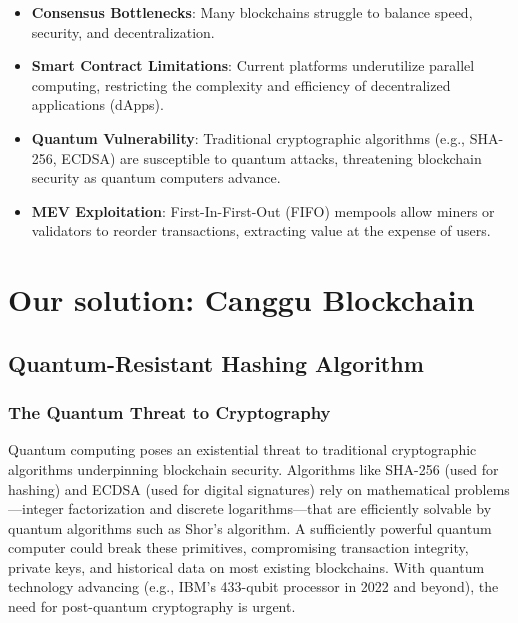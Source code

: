 \documentclass[12pt]{article}
\begin{document}
\begin{justify}
\begin{itemize}

    \item \textbf{Consensus Bottlenecks}: Many blockchains struggle to balance speed, security, and decentralization.
\item \textbf{Smart Contract Limitations}: Current platforms underutilize parallel computing, restricting the complexity and efficiency of decentralized applications (dApps).

    \item     \textbf{Quantum Vulnerability}: Traditional cryptographic algorithms (e.g., SHA-256, ECDSA) are susceptible to quantum attacks, threatening blockchain security as quantum computers advance.

    \item \textbf{MEV Exploitation}: First-In-First-Out (FIFO) mempools allow miners or validators to reorder transactions, extracting value at the expense of users.
    
\end{itemize}
\end{justify}

\section{Our solution: Canggu Blockchain}
\subsection{Quantum-Resistant Hashing Algorithm}
\subsubsection{The Quantum Threat to Cryptography}

\begin{justify}
    Quantum computing poses an existential threat to traditional cryptographic algorithms underpinning blockchain security. Algorithms like SHA-256 (used for hashing) and ECDSA (used for digital signatures) rely on mathematical problems—integer factorization and discrete logarithms—that are efficiently solvable by quantum algorithms such as Shor’s algorithm. A sufficiently powerful quantum computer could break these primitives, compromising transaction integrity, private keys, and historical data on most existing blockchains. With quantum technology advancing (e.g., IBM’s 433-qubit processor in 2022 and beyond), the need for post-quantum cryptography is urgent.
    
\end{justify}
\end{document}
